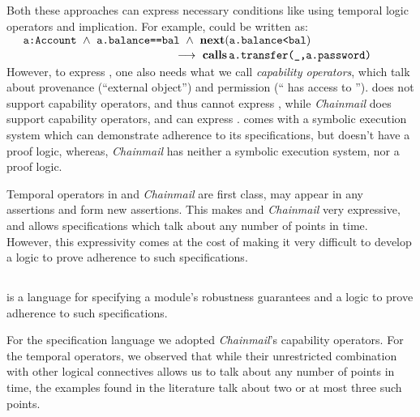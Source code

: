 Both these approaches can express necessary conditions
  like \SrobustA using
  temporal logic operators and implication. For example,  \SrobustA
 could be written as:
\\
 $\strut ~  ~ \hspace{.1in} \strut  \prg{a:Account} \ \wedge\ \prg{a.balance==bal}  \ \wedge\ \textbf{next}(\prg{a.balance<bal}) $\\
 $\strut ~ \hspace{2in} \strut \strut \strut \longrightarrow\    \textbf{calls}\, {\texttt{a.transfer(\_,a.password)}}$
 \\
 { However, to express \SrobustB, one also needs what we call \emph{capability operators}, which talk about 
 provenance (``external object'') and
  permission (`` has access to ''). 
   {}  does not support capability operators, and thus cannot express   \SrobustB, 
   while  \emph{Chainmail} does support capability operators, and can express  \SrobustB. 
}  
 {} comes with a symbolic 
  execution system which can demonstrate adherence to its specifications, but doesn't have a proof logic, %
   whereas, \emph{Chainmail}   {has neither a symbolic execution system, nor a proof logic.}
  
 {Temporal operators in {}   and  \emph{Chainmail}  are first class, \ie may appear in any assertions 
and form new assertions. This makes {}   and  \emph{Chainmail} very expressive,
and allows specifications which talk about any number of points in time.
However, this expressivity comes at the cost of making it very difficult to develop a logic to
prove adherence to such specifications.}
  
\vspace{.04in}

\subsection{\Nec}
\label{intro:this:work}
\Nec is a language for specifying a module's robustness guarantees 
and a logic 
to prove adherence to such specifications.

For the specification language we adopted  
\emph{Chainmail}'s    capability operators.
{For the 
  temporal operators, we observed that while their
   unrestricted combination with  other logical connectives allows us to talk about any
   number of points in time, the examples found in the literature talk about two or at most three such points. }

